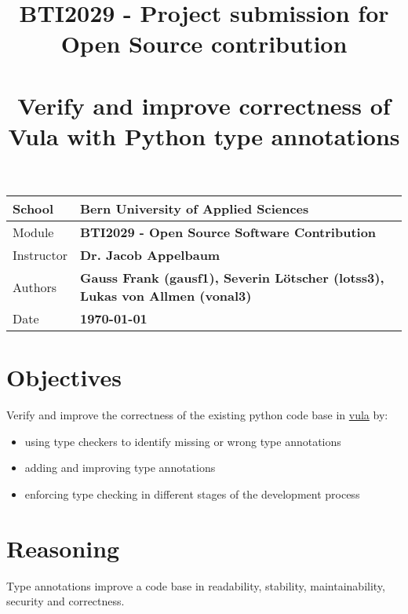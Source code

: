 \documentclass{article}
\title{
    BTI2029 - Project submission for Open Source contribution\\
    \large
    ~\\
    \textbf{Verify and improve correctness of Vula with Python type annotations}
}
\author{}
\date{}
\begin{document}
    \maketitle
    \vspace{-2cm}

    \begin{table}[H]
        \begin{tabularx}{1\textwidth}{l X}
            \toprule
            School & \textbf{Bern University of Applied Sciences} \\
            \midrule
            Module & \textbf{BTI2029 - Open Source Software Contribution} \\
            \midrule
            Instructor & \textbf{Dr. Jacob Appelbaum} \\
            \midrule
            Authors  & \textbf{Gauss Frank (gausf1), Severin Lötscher (lotss3), Lukas von Allmen (vonal3)} \\
            \midrule
            Date  & \textbf{\today} \\
            \bottomrule
        \end{tabularx}
        \label{tab:general-information}
    \end{table}
    \section{Objectives}\label{sec:objectives}

    Verify and improve the correctness of the existing python code base in \href{https://vula.link/}{vula} by:
    \begin{itemize}
        \item using type checkers to identify missing or wrong type annotations
        \item adding and improving type annotations
        \item enforcing type checking in different stages of the development process
    \end{itemize}

    \section{Reasoning}\label{sec:reasoning}
    Type annotations improve a code base in readability, stability, maintainability, security and correctness.

\end{document}
